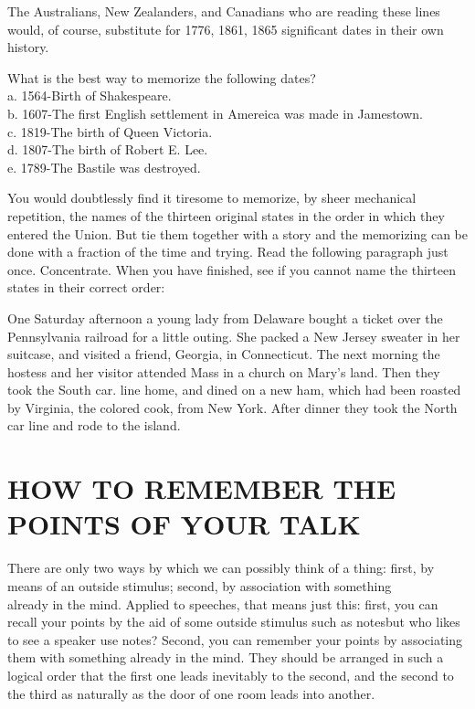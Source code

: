 \documentclass[10pt]{article}
\begin{document}
The Australians, New Zealanders, and Canadians who are reading these lines would, of course, substitute for 1776, 1861, 1865 significant dates in their own history.

What is the best way to memorize the following dates?\\
a. 1564-Birth of Shakespeare.\\
b. 1607-The first English settlement in Amereica was made in Jamestown.\\
c. 1819-The birth of Queen Victoria.\\
d. 1807-The birth of Robert E. Lee.\\
e. 1789-The Bastile was destroyed.

You would doubtlessly find it tiresome to memorize, by sheer mechanical repetition, the names of the thirteen original states in the order in which they entered the Union. But tie them together with a story and the memorizing can be done with a fraction of the time and trying. Read the following paragraph just once. Concentrate. When you have finished, see if you cannot name the thirteen states in their correct order:

One Saturday afternoon a young lady from Delaware bought a ticket over the Pennsylvania railroad for a little outing. She packed a New Jersey sweater in her suitcase, and visited a friend, Georgia, in Connecticut. The next morning the hostess and her visitor attended Mass in a church on Mary's land. Then they took the South car. line home, and dined on a new ham, which had been roasted by Virginia, the colored cook, from New York. After dinner they took the North car line and rode to the island.

\section*{HOW TO REMEMBER THE POINTS OF YOUR TALK}
There are only two ways by which we can possibly think of a thing: first, by means of an outside stimulus; second, by association with something\\
already in the mind. Applied to speeches, that means just this: first, you can recall your points by the aid of some outside stimulus such as notesbut who likes to see a speaker use notes? Second, you can remember your points by associating them with something already in the mind. They should be arranged in such a logical order that the first one leads inevitably to the second, and the second to the third as naturally as the door of one room leads into another.
\end{document}
